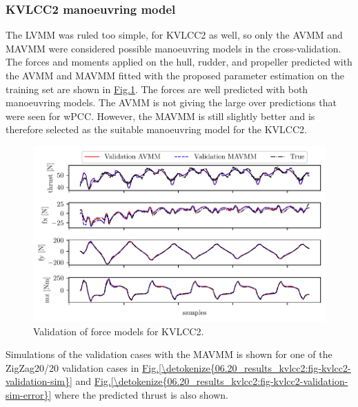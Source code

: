 \subsubsection{KVLCC2 manoeuvring model}
\label{\detokenize{06.20_results_kvlcc2:kvlcc2-manoeuvring-model}}

The LVMM was ruled too simple, for KVLCC2 as well, so only the AVMM and MAVMM were considered possible manoeuvring models in the cross-validation.
The forces and moments applied on the hull, rudder, and propeller predicted with the AVMM and MAVMM fitted with the proposed parameter estimation on the training set are shown in \hyperref[\detokenize{06.20_results_kvlcc2:fig-kvlcc2-validation-forces}]{Fig.\@ \ref{\detokenize{06.20_results_kvlcc2:fig-kvlcc2-validation-forces}}}.
The forces are well predicted with both manoeuvring models. The AVMM is not giving the large over predictions that were seen for wPCC. However, the MAVMM is still slightly better and is therefore selected as the suitable manoeuvring model for the KVLCC2.

\begin{figure}[!htb]
\centering
\includegraphics{kappa/images/13.pdf}
\caption{Validation of force models for KVLCC2.}\label{\detokenize{06.20_results_kvlcc2:fig-kvlcc2-validation-forces}}\end{figure}


Simulations of the validation cases with the MAVMM is shown for one of the ZigZag20/20 validation cases in \hyperref[\detokenize{06.20_results_kvlcc2:fig-kvlcc2-validation-sim}]{Fig.\@ \ref{\detokenize{06.20_results_kvlcc2:fig-kvlcc2-validation-sim}}} and \hyperref[\detokenize{06.20_results_kvlcc2:fig-kvlcc2-validation-sim-error}]{Fig.\@ \ref{\detokenize{06.20_results_kvlcc2:fig-kvlcc2-validation-sim-error}}} where the predicted thrust is also shown.

